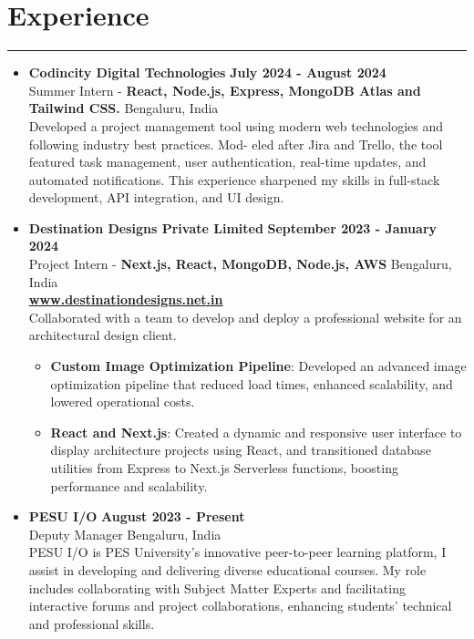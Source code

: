\documentclass[a4paper,10.5pt]{article}  %
\begin{document}
\section*{Experience}
\vspace{-.3em}
\hrule
\vspace{0.4em}
\begin{itemize}
    \item \textbf{Codincity Digital Technologies} \hfill \textbf{July 2024 - August 2024} \vspace{0.3em} \\ 
    Summer Intern - \textbf{React, Node.js, Express, MongoDB Atlas and Tailwind CSS.} \vspace{0.3em} \hfill Bengaluru, India \\
    Developed a project management tool using modern web technologies and following industry best practices. Mod- eled after Jira and Trello, the tool featured task management, user authentication, real-time updates, and automated notifications. This experience sharpened my skills in full-stack development, API integration, and UI design.
          
    \item \vspace{0.3em} \textbf{Destination Designs Private Limited} \hfill \textbf{September 2023 - January 2024} \vspace{0.3em} \\
          Project Intern - \textbf{Next.js, React, MongoDB, Node.js, AWS} \hfill Bengaluru, India \\ \textbf{\href{https://www.destinationdesigns.net.in/}
          {\underline{www.destinationdesigns.net.in}}}  \vspace{0.3em} \\ Collaborated with a team to develop and deploy a professional website for an architectural design client. 
	      \begin{itemize}
		      \item \textbf{Custom Image Optimization Pipeline}: Developed an advanced image optimization pipeline that reduced load times, enhanced scalability, and lowered operational costs.
		      \item \textbf{React and Next.js}: Created a dynamic and responsive user interface to display architecture projects using React, and transitioned database utilities from Express to Next.js Serverless functions, boosting performance and scalability.
	      \end{itemize}
    \item \vspace{0.3em} \textbf{PESU I/O} \hfill \textbf{August 2023 - Present} \\ 
    Deputy Manager \hfill Bengaluru, India \vspace{0.3em} \\
    PESU I/O is PES University’s innovative peer-to-peer learning platform, I assist in developing and delivering diverse educational courses. My role includes collaborating with Subject Matter Experts and facilitating interactive forums and project collaborations, enhancing students’ technical and professional skills.

\end{itemize}
\end{document}
